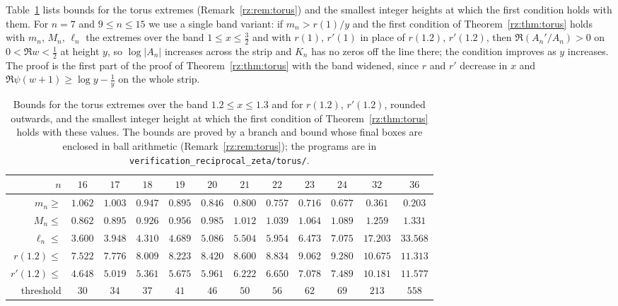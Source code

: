 Table~\ref{rz:tab:torus} lists bounds for the torus extremes (Remark~\ref{rz:rem:torus}) and the smallest integer heights at which the first condition holds with them. For $n=7$ and $9\le n\le15$ we use a single band variant: if $m_n>r(1)/y$ and the first condition of Theorem~\ref{rz:thm:torus} holds with $m_n$, $M_n$, $\ell_n$ the extremes over the band $1\le x\le\frac32$ and with $r(1)$, $r'(1)$ in place of $r(1.2)$, $r'(1.2)$, then $\Re(A_n'/A_n)>0$ on $0<\Re w<\frac12$ at height $y$, so $\log|A_n|$ increases across the strip and $K_n$ has no zeros off the line there; the condition improves as $y$ increases. The proof is the first part of the proof of Theorem~\ref{rz:thm:torus} with the band widened, since $r$ and $r'$ decrease in $x$ and $\Re\psi(w+1)\ge\log y-\frac1y$ on the whole strip.

\begin{table}[htbp]
\centering
\small
\setlength{\tabcolsep}{3pt}
\begin{tabular}{rccccccccccc}
\toprule
$n$ & $16$ & $17$ & $18$ & $19$ & $20$ & $21$ & $22$ & $23$ & $24$ & $32$ & $36$\\
\midrule
$m_n\ge$ & $1.062$ & $1.003$ & $0.947$ & $0.895$ & $0.846$ & $0.800$ & $0.757$ & $0.716$ & $0.677$ & $0.361$ & $0.203$\\
$M_n\le$ & $0.862$ & $0.895$ & $0.926$ & $0.956$ & $0.985$ & $1.012$ & $1.039$ & $1.064$ & $1.089$ & $1.259$ & $1.331$\\
$\ell_n\le$ & $3.600$ & $3.948$ & $4.310$ & $4.689$ & $5.086$ & $5.504$ & $5.954$ & $6.473$ & $7.075$ & $17.203$ & $33.568$\\
$r(1.2)\le$ & $7.522$ & $7.776$ & $8.009$ & $8.223$ & $8.420$ & $8.600$ & $8.834$ & $9.062$ & $9.280$ & $10.675$ & $11.313$\\
$r'(1.2)\le$ & $4.648$ & $5.019$ & $5.361$ & $5.675$ & $5.961$ & $6.222$ & $6.650$ & $7.078$ & $7.489$ & $10.181$ & $11.577$\\
threshold & $30$ & $34$ & $37$ & $41$ & $46$ & $50$ & $56$ & $62$ & $69$ & $213$ & $558$\\
\bottomrule
\end{tabular}
\caption{Bounds for the torus extremes over the band $1.2\le x\le1.3$ and for $r(1.2)$, $r'(1.2)$, rounded outwards, and the smallest integer height at which the first condition of Theorem~\ref{rz:thm:torus} holds with these values. The bounds are proved by a branch and bound whose final boxes are enclosed in ball arithmetic (Remark~\ref{rz:rem:torus}); the programs are in \texttt{verification\_reciprocal\_zeta/torus/}.}
\label{rz:tab:torus}
\end{table}

